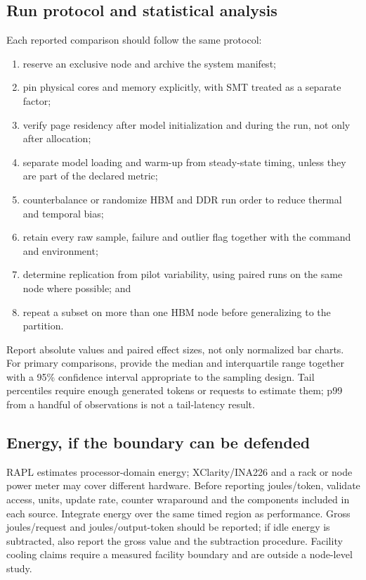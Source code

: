 \subsection{Run protocol and statistical analysis}

Each reported comparison should follow the same protocol:

\begin{enumerate}
  \item reserve an exclusive node and archive the system manifest;
  \item pin physical cores and memory explicitly, with SMT treated as a
        separate factor;
  \item verify page residency after model initialization and during the
        run, not only after allocation;
  \item separate model loading and warm-up from steady-state timing,
        unless they are part of the declared metric;
  \item counterbalance or randomize HBM and DDR run order to reduce
        thermal and temporal bias;
  \item retain every raw sample, failure and outlier flag together with
        the command and environment;
  \item determine replication from pilot variability, using paired runs
        on the same node where possible; and
  \item repeat a subset on more than one HBM node before generalizing to
        the partition.
\end{enumerate}

Report absolute values and paired effect sizes, not only normalized bar
charts.  For primary comparisons, provide the median and interquartile
range together with a 95\% confidence interval appropriate to the
sampling design.  Tail percentiles require enough generated tokens or
requests to estimate them; p99 from a handful of observations is not a
tail-latency result.

\subsection{Energy, if the boundary can be defended}

RAPL estimates processor-domain energy; XClarity/INA226 and a rack or
node power meter may cover different hardware.  Before reporting
joules/token, validate access, units, update rate, counter wraparound and
the components included in each source.  Integrate energy over the same
timed region as performance.  Gross joules/request and
joules/output-token should be reported; if idle energy is subtracted,
also report the gross value and the subtraction procedure.  Facility
cooling claims require a measured facility boundary and are outside a
node-level study.

